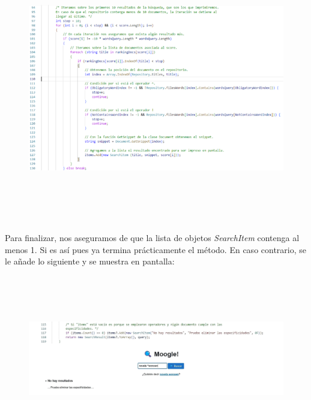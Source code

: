 \documentclass{article}
\begin{document}
\begin{figure}[t]
	\begin{center}
		\includegraphics[width = 14cm, height = 10cm]{img9.png}
	\end{center}
\end{figure}


\ 


Para finalizar, nos aseguramos de que la lista de objetos {\textit{SearchItem}} contenga al menos 1. Si es así
pues ya termina prácticamente el método. En caso contrario, se le añade lo siguiente y se muestra
en pantalla:


\


\begin{figure}[h]
	\begin{center}
		\includegraphics[width=16cm, height=5.5cm]{img10.png}
	\end{center}
\end{figure}
\end{document}

